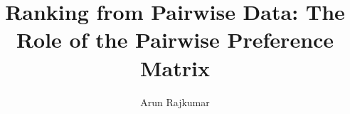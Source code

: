 \documentclass[12pt, twoside]{iiscthes}
\begin{document}
\begin{frontmatter}
%
%

\title{Ranking from Pairwise Data: The Role of the Pairwise Preference Matrix
	}
\author{Arun Rajkumar}
\enggfaculty
\iisclogotrue %
\tablespagetrue %
\maketitle
%


\end{frontmatter}
\end{document}
